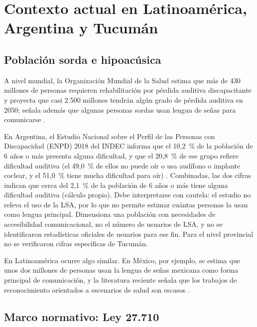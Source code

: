 \section{Contexto actual en Latinoamérica, Argentina y Tucumán}

\subsection{Población sorda e hipoacúsica}

A nivel mundial, la Organización Mundial de la Salud estima que más de 430 millones de personas requieren rehabilitación por pérdida auditiva discapacitante y proyecta que casi 2.500 millones tendrán algún grado de pérdida auditiva en 2050; señala además que algunas personas sordas usan lengua de señas para comunicarse \parencite{oms2025sordera}.

En Argentina, el Estudio Nacional sobre el Perfil de las Personas con Discapacidad (ENPD) 2018 del INDEC informa que el 10,2~\% de la población de 6 años o más presenta alguna dificultad, y que el 20,8~\% de ese grupo refiere dificultad auditiva (el 49,0~\% de ellos no puede oír o usa audífono o implante coclear, y el 51,0~\% tiene mucha dificultad para oír) \parencite{indec2018}. Combinadas, las dos cifras indican que cerca del 2,1~\% de la población de 6 años o más tiene alguna dificultad auditiva (cálculo propio). Debe interpretarse con cautela: el estudio no releva el uso de la LSA, por lo que no permite estimar cuántas personas la usan como lengua principal. Dimensiona una población con necesidades de accesibilidad comunicacional, no el número de usuarios de LSA, y no se identificaron estadísticas oficiales de usuarios para ese fin. Para el nivel provincial no se verificaron cifras específicas de Tucumán.

En Latinoamérica ocurre algo similar. En México, por ejemplo, se estima que unos dos millones de personas usan la lengua de señas mexicana como forma principal de comunicación, y la literatura reciente señala que los trabajos de reconocimiento orientados a escenarios de salud son escasos \parencite{becerril2025msl}.

\subsection{Marco normativo: Ley 27.710}

